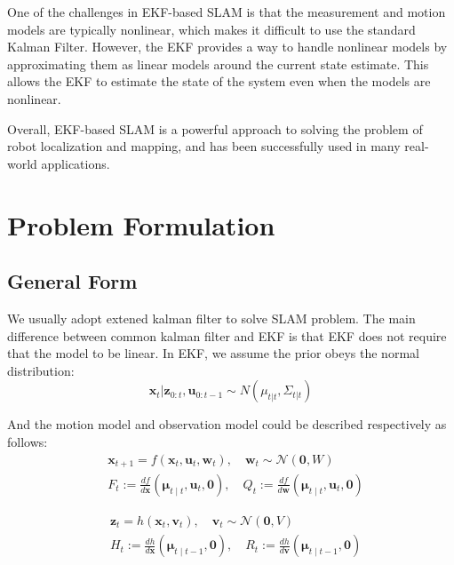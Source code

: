 \documentclass[conference]{IEEEtran}
\begin{document}
One of the challenges in EKF-based SLAM is that the measurement and motion models are typically nonlinear, which makes it difficult to use the standard Kalman Filter. However, the EKF provides a way to handle nonlinear models by approximating them as linear models around the current state estimate. This allows the EKF to estimate the state of the system even when the models are nonlinear.

Overall, EKF-based SLAM is a powerful approach to solving the problem of robot localization and mapping, and has been successfully used in many real-world applications.


\section{Problem Formulation}
\subsection{General Form}
We usually adopt extened kalman filter to solve SLAM problem. The main difference between common kalman filter and EKF is that
EKF does not require that the model to be linear. In EKF, we assume the prior obeys the normal distribution:
\begin{equation}
    \mathbf{x}_t | \mathbf{z}_{0:t}, \mathbf{u}_{0:t-1} \sim N (\mu_{t|t}, \Sigma_{t|t})
\end{equation}

And the motion model and observation model could be described respectively as follows:
\begin{equation}
    \begin{aligned}
    & \mathbf{x}_{t+1}=f\left(\mathbf{x}_t, \mathbf{u}_t, \mathbf{w}_t\right), \quad \mathbf{w}_t \sim \mathcal{N}(\mathbf{0}, W) \\
    & F_t:=\frac{d f}{d \mathbf{x}}\left(\boldsymbol{\mu}_{t \mid t}, \mathbf{u}_t, \mathbf{0}\right), \quad Q_t:=\frac{d f}{d \mathbf{w}}\left(\boldsymbol{\mu}_{t \mid t}, \mathbf{u}_t, \mathbf{0}\right)
    \end{aligned}
\end{equation}

\begin{equation}
    \begin{aligned}
    & \mathbf{z}_t=h\left(\mathbf{x}_t, \mathbf{v}_t\right), \quad \mathbf{v}_t \sim \mathcal{N}(\mathbf{0}, V) \\
    & H_t:=\frac{d h}{d \mathbf{x}}\left(\boldsymbol{\mu}_{t \mid t-1}, \mathbf{0}\right), \quad R_t:=\frac{d h}{d \mathbf{v}}\left(\boldsymbol{\mu}_{t \mid t-1}, \mathbf{0}\right)
    \end{aligned}
\end{equation}
\end{document}
